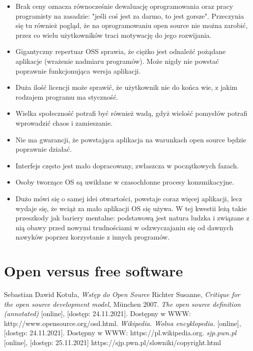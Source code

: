 \documentclass{article}
\begin{document}
\begin{itemize}
    \item Brak ceny oznacza równocześnie dewaluację oprogramowania oraz pracy programisty na zasadzie: "jeśli coś jest za darmo, to jest gorsze". Przeczynia się tu również pogląd, że na oprogramowaniu open source nie można zarobić, przez co wielu użytkowników traci motywację do jego rozwijania\cite{Kotula}.
    
    \item Gigantyczny repertuar OSS sprawia, że ciężko jest odnaleźć pożądane aplikacje (wrażenie nadmiaru programów). Może nigdy nie powstać poprawnie funkcjonująca wersja aplikacji\cite{Kotula}.
    
    \item Duża ilość licencji może sprawić, że użytkownik nie do końca wie, z jakim rodzajem programu ma styczność\cite{Kotula}.
    
    \item Wielka społeczność potrafi być również wadą, gdyż wielość pomysłów potrafi wprowadzić chaos i zamieszanie\cite{Kotula}.
    
    \item Nie ma gwarancji, że powstająca aplikacja na warunkach open source będzie poprawnie działać\cite{Kotula}.
    
    \item Interfejs często jest mało dopracowany, zwłaszcza w początkowych fazach\cite{Kotula}.
    
    \item Osoby tworzące OS są uwikłane w czasochłonne procesy komunikacyjne\cite{Kotula}.
    
    \item Dużo mówi się o samej idei otwartości, powstaje coraz więcej aplikacji, lecz wydaje się, że wciąż za mało aplikacji OS się używa. W tej kwestii leżą takie przeszkody jak bariery mentalne: podstawową jest natura ludzka i związane z nią obawy przed nowymi trudnościami w odzwyczajaniu się od dawnych nawyków poprzez korzystanie z innych programów\cite{Kotula}.
\end{itemize}

\section{Open versus free software}

\newpage
\begin{thebibliography}{99}
    Sebastian Dawid Kotuła,
    \emph{Wstęp do Open Source}
  Richter Susanne, \emph{Critique for the open source development model,} München 2007.
  \emph{The open source definition (annotated)} [online], [dostęp: 24.11.2021]. Dostępny w WWW: http://www.opensource.org/osd.html.
  \emph{Wikipedia. Wolna encyklopedia.} [online], [dostęp: 24.11.2021]. Dostępny w WWW: https://pl.wikipedia.org.
  \emph{sjp.pwn.pl} [online], [dostęp: 25.11.2021] https://sjp.pwn.pl/slowniki/copyright.html

\end{thebibliography}
\end{document}
